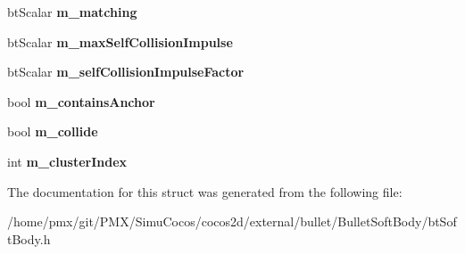 \begin{DoxyCompactItemize}
bt\+Scalar {\bfseries m\+\_\+matching}
\item 
\mbox{\label{structbtSoftBody_1_1Cluster_a4863386788f38b4b1f59c42a69df7e15}} 
bt\+Scalar {\bfseries m\+\_\+max\+Self\+Collision\+Impulse}
\item 
\mbox{\label{structbtSoftBody_1_1Cluster_adc335614389856a98e06e5dc10e89c2b}} 
bt\+Scalar {\bfseries m\+\_\+self\+Collision\+Impulse\+Factor}
\item 
\mbox{\label{structbtSoftBody_1_1Cluster_ac40f1e6c289a6c81cfbede28884cd53a}} 
bool {\bfseries m\+\_\+contains\+Anchor}
\item 
\mbox{\label{structbtSoftBody_1_1Cluster_ab64d0063b57ece06113a4d96dfcdbd2c}} 
bool {\bfseries m\+\_\+collide}
\item 
\mbox{\label{structbtSoftBody_1_1Cluster_a9e0de77b4b37fd740da6bd2536505f64}} 
int {\bfseries m\+\_\+cluster\+Index}
\end{DoxyCompactItemize}


The documentation for this struct was generated from the following file\+:\begin{DoxyCompactItemize}
\item 
/home/pmx/git/\+P\+M\+X/\+Simu\+Cocos/cocos2d/external/bullet/\+Bullet\+Soft\+Body/bt\+Soft\+Body.\+h\end{DoxyCompactItemize}
